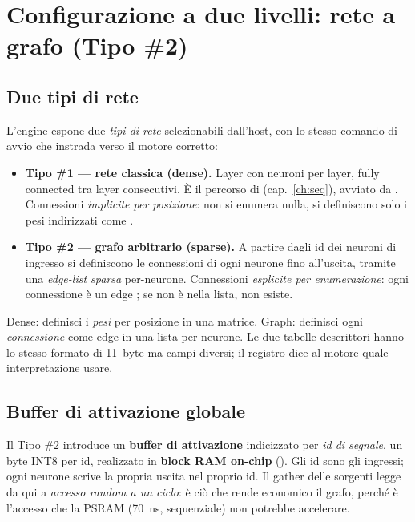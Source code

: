 \chapter[Rete a grafo (Tipo \#2)]{Configurazione a due livelli: rete a grafo (Tipo \#2)}
\label{ch:grafo}

\section{Due tipi di rete}
L'engine espone due \emph{tipi di rete} selezionabili dall'host, con lo stesso comando di
avvio che instrada verso il motore corretto:

\begin{itemize}
\item \textbf{Tipo \#1 --- rete classica (dense).} Layer con neuroni per layer, fully
connected tra layer consecutivi. È il percorso di 
(cap.~\ref{ch:seq}), avviato da . Connessioni \emph{implicite per
posizione}: non si enumera nulla, si definiscono solo i pesi indirizzati come
.
\item \textbf{Tipo \#2 --- grafo arbitrario (sparse).} A partire dagli id dei neuroni di
ingresso si definiscono le connessioni di ogni neurone fino all'uscita, tramite una
\emph{edge-list sparsa} per-neurone. Connessioni \emph{esplicite per enumerazione}: ogni
connessione è un edge ; se non è nella lista, non esiste.
\end{itemize}

\begin{fnnote}
Dense: definisci i \emph{pesi} per posizione in una matrice. Graph: definisci ogni
\emph{connessione} come edge  in una lista per-neurone. Le due
tabelle descrittori hanno lo stesso formato di 11~byte ma campi diversi; il registro
 dice al motore quale interpretazione usare.
\end{fnnote}

\section{Buffer di attivazione globale}
Il Tipo \#2 introduce un \textbf{buffer di attivazione} indicizzato per \emph{id di
segnale}, un byte INT8 per id, realizzato in \textbf{block RAM on-chip }
(). Gli id  sono gli ingressi; ogni neurone
scrive la propria uscita nel proprio id. Il gather delle sorgenti legge da qui a
\emph{accesso random a un ciclo}: è ciò che rende economico il grafo, perché è l'accesso
che la PSRAM (70~ns, sequenziale) non potrebbe accelerare.

